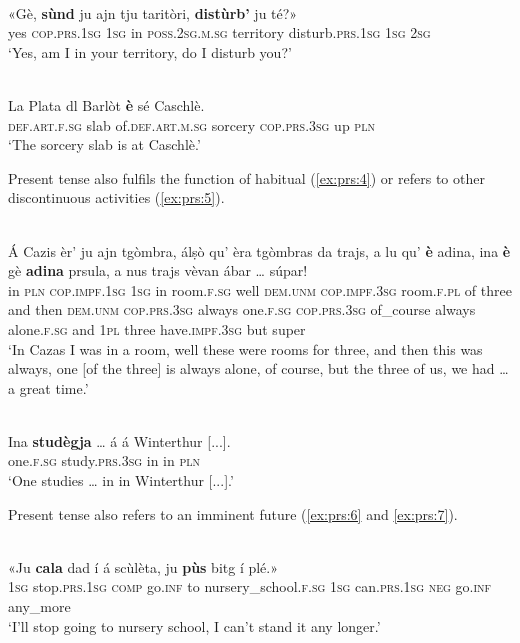 \ea\label{ex:prs:2}
\\
\gll «Gè, \textbf{sùnd} ju ajn tju taritòri, \textbf{distùrb’} ju té?»   \\
yes \textsc{cop.prs.1sg} \textsc{1sg} in \textsc{poss.2sg.m.sg} territory disturb.\textsc{prs.1sg} \textsc{1sg} \textsc{2sg} \\
\glt `Yes, am I in your territory, do I disturb you?'
\z

\ea\label{ex:prs:3}
\\
\gll    La Plata dl Barlòt \textbf{è} sé Caschlè.\\
\textsc{def.art.f.sg} slab of.\textsc{def.art.m.sg} sorcery \textsc{cop.prs.3sg} up \textsc{pln}\\
\glt `The sorcery slab is at Caschlè.'
\z

Present tense also fulfils the function of habitual (\ref{ex:prs:4}) or refers to other discontinuous activities (\ref{ex:prs:5}).
 
\ea\label{ex:prs:4}
\\
\gll    Á Cazis èr’ ju ajn tgòmbra, álṣò qu’ èra tgòmbras da trajs, a lu qu’ \textbf{è} adina, ina \textbf{è} gè \textbf{adina} prsula, a nus trajs vèvan ábar … súpar!\\
in \textsc{pln} \textsc{cop.impf.1sg}	\textsc{1sg} in room.\textsc{f.sg} well \textsc{dem.unm} \textsc{cop.impf.3sg} room.\textsc{f.pl} of three and then \textsc{dem.unm} \textsc{cop.prs.3sg} always  one.\textsc{f.sg} \textsc{cop.prs.3sg} of\_course always alone.\textsc{f.sg} and \textsc{1pl} three have.\textsc{impf.3sg} but {} super\\
\glt `In Cazas I was in a room, well these were rooms for three, and then this was always, one [of the three] is always alone, of course, but the three of us, we had … a great time.'
\z

\ea\label{ex:prs:5}
\\
\gll    Ina \textbf{studègja} … á á Winterthur [...].\\
one.\textsc{f.sg} study.\textsc{prs.3sg} {} in in \textsc{pln}\\
\glt `One studies … in in Winterthur [...].'
\z

Present tense also refers to an imminent future (\ref{ex:prs:6} and \ref{ex:prs:7}). 

\ea\label{ex:prs:6}
\\
\gll  «Ju \textbf{cala} dad í á scùlèta, ju \textbf{pùs} bitg í plé.»\\
\textsc{1sg} stop.\textsc{prs.1sg} \textsc{comp} go.\textsc{inf} to nursery\_school.\textsc{f.sg} \textsc{1sg} can.\textsc{prs.1sg} \textsc{neg} go.\textsc{inf} any\_more  \\
\glt `I’ll stop going to nursery school, I can’t stand it any longer.'
\z

